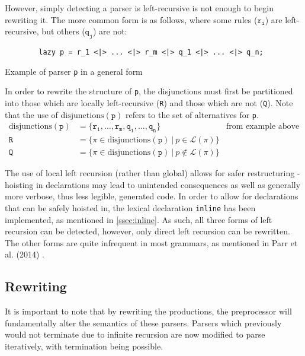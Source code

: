 However, simply detecting a parser is left-recursive is not enough to begin rewriting it.
The more common form is as follows, where some rules ($\texttt{r}_\texttt{i}$) are left-recursive, but others ($\texttt{q}_\texttt{j}$) are not:

\begin{capminted}
    \begin{verbatim}
        lazy p = r_1 <|> ... <|> r_m <|> q_1 <|> ... <|> q_n;
    \end{verbatim}
    \vspace{-0.5\baselineskip}
    \caption{Example of parser \texttt{p} in a general form}
    \label{lst:p_general}
\end{capminted}

In order to rewrite the structure of \texttt{p}, the disjunctions must first be partitioned into those which are locally left-recursive (\texttt{R}) and those which are not (\texttt{Q}).
Note that the use of $\text{disjunctions}(\texttt{p})$ refers to the set of alternatives for \texttt{p}.
\begin{align*}
    \text{disjunctions}(\texttt{p}) & = \{ \texttt{r}_\texttt{1}, \dots, \texttt{r}_\texttt{m}, \texttt{q}_\texttt{1}, \dots, \texttt{q}_\texttt{n} \} & \text{from example above} \\
    \texttt{R} & = \{ \pi \in \text{disjunctions}(\texttt{p})\ |\ p \in \mathcal{L}(\pi) \} \\
    \texttt{Q} & = \{ \pi \in \text{disjunctions}(\texttt{p})\ |\ p \notin \mathcal{L}(\pi) \}
\end{align*}

The use of local left recursion (rather than global) allows for safer restructuring - hoisting in declarations may lead to unintended consequences as well as generally more verbose, thus less legible, generated code.
In order to allow for declarations that can be safely hoisted in, the lexical declaration \texttt{inline} has been implemented, as mentioned in \autoref{ssec:inline}.
As such, all three forms of left recursion can be detected, however, only direct left recursion can be rewritten.
The other forms are quite infrequent in most grammars, as mentioned in Parr et al. (2014) \cite{parr14}.

\subsection{Rewriting}
\label{ssec:lrec_rewrite}
It is important to note that by rewriting the productions, the preprocessor will fundamentally alter the semantics of these parsers.
Parsers which previously would not terminate due to infinite recursion are now modified to parse iteratively, with termination being possible.

